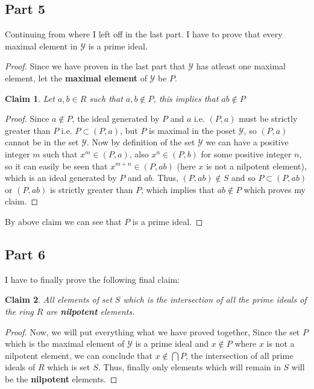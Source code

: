 \documentclass{article}
\let\bold\textbf
\newtheorem{claim}{Claim}[subsection]
\begin{document}
{  \subsection{Part 5}{
    Continuing from where I left off in the last part. \newline
    I have to prove that every maximal element in $\mathcal{Y}$ is a prime ideal.
    \begin{proof}
      Since we have proven in the last part that $\mathcal{Y}$ has atleast one maximal element, let the \bold{maximal element} of $\mathcal{Y}$ be $P$.
      \begin{claim}
        Let $a,b \in R$ such that $a,b \notin P$, this implies that $ab \notin P$
      \end{claim}
      \begin{proof}
        Since $a \notin P$, the ideal generated by $P$ and $a$ i.e. $(P,a)$ must be strictly greater than $P$ i.e. $P \subset (P,a)$, but $P$ is maximal in the poset $\mathcal{Y}$, so $(P,a)$ cannot be in the set $\mathcal{Y}$. \newline
        Now by definition of the set $\mathcal{Y}$ we can have a positive integer $m$ such that $x^m \in (P,a)$, also $x^n \in (P,b)$ for some positive integer $n$, so it can easily be seen that $x^{m+n} \in (P,ab)$ (here $x$ is not a nilpotent element), which is an ideal generated by $P$ and $ab$. \newline
        Thus, $(P,ab) \notin S$ and so $P \subset (P,ab)$ or $(P,ab)$ is strictly greater than $P$, which implies that $ab \notin P$ which proves my claim.
      \end{proof}
      By above claim we can see that $P$ is a prime ideal.
    \end{proof}
  }
  \subsection{Part 6}{
    I have to finally prove the following final claim:
    \begin{claim}
      All elements of set $S$ which is the intersection of all the prime ideals of the ring $R$ are \bold{nilpotent} elements.
    \end{claim}
    \begin{proof}
      Now, we will put everything what we have proved together, Since the set $P$ which is the maximal element of $\mathcal{Y}$ is a prime ideal and $x \notin P$ where $x$ is not a nilpotent element, we can conclude that $x \notin \bigcap P$, the intersection of all prime ideals of $R$ which is set $S$. \newline
      Thus, finally only elements which will remain in $S$ will be the \bold{nilpotent} elements.
    \end{proof}
  }
}
\newpage
\end{document}
